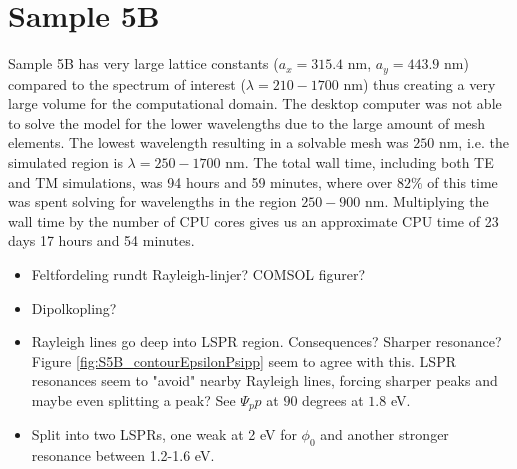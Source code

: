 \clearpage
\section{Sample 5B}
Sample 5B has very large lattice constants ($a_x=315.4$ nm, $a_y=443.9$ nm) compared to the spectrum of interest ($\lambda=210-1700$ nm) thus creating a very large volume for the computational domain. The desktop computer was not able to solve the model for the lower wavelengths due to the large amount of mesh elements. The lowest wavelength resulting in a solvable mesh was $250$ nm, i.e. the simulated region is $\lambda=250-1700$ nm. The total wall time, including both TE and TM simulations, was 94 hours and 59 minutes, where over $82\%$ of this time was spent solving for wavelengths in the region $250-900$ nm. Multiplying the wall time by the number of CPU cores gives us an approximate CPU time of 23 days 17 hours and 54 minutes.
\begin{itemize}

    \item Feltfordeling rundt Rayleigh-linjer? COMSOL figurer?
    \item Dipolkopling?
    \item Rayleigh lines go deep into LSPR region. Consequences? Sharper resonance? Figure \ref{fig:S5B_contourEpsilonPsipp} seem to agree with this. LSPR resonances seem to "avoid" nearby Rayleigh lines, forcing sharper peaks and maybe even splitting a peak? See $\Psi_pp$ at $90$ degrees at $1.8$ eV.
    \item Split into two LSPRs, one weak at 2 eV for $\phi_0$ and another stronger resonance between 1.2-1.6 eV.
\end{itemize}

